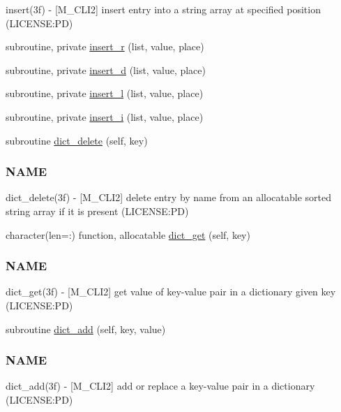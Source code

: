 \begin{DoxyCompactItemize}
\begin{DoxyCompactList}
insert(3f) -\/ \mbox{[}M\+\_\+\+C\+L\+I2\mbox{]} insert entry into a string array at specified position (L\+I\+C\+E\+N\+SE\+:PD) \end{DoxyCompactList}\item 
subroutine, private \mbox{\hyperlink{namespacem__cli2_ae43e655d3678fcc31824a3e9db3daae1}{insert\+\_\+r}} (list, value, place)
\item 
subroutine, private \mbox{\hyperlink{namespacem__cli2_a737ae8e6f73a3fc8cc260732c047fafb}{insert\+\_\+d}} (list, value, place)
\item 
subroutine, private \mbox{\hyperlink{namespacem__cli2_a7e5ee66813d8f6db9d48ebdc350a6b3e}{insert\+\_\+l}} (list, value, place)
\item 
subroutine, private \mbox{\hyperlink{namespacem__cli2_afa6f00a57f1252ba5daa0c440a23ffbb}{insert\+\_\+i}} (list, value, place)
\item 
subroutine \mbox{\hyperlink{namespacem__cli2_afcdd2c59305faf341ebf8ec3b115a05e}{dict\+\_\+delete}} (self, key)
\begin{DoxyCompactList}\small\item\em \subsubsection*{N\+A\+ME}

dict\+\_\+delete(3f) -\/ \mbox{[}M\+\_\+\+C\+L\+I2\mbox{]} delete entry by name from an allocatable sorted string array if it is present (L\+I\+C\+E\+N\+SE\+:PD) \end{DoxyCompactList}\item 
character(len=\+:) function, allocatable \mbox{\hyperlink{namespacem__cli2_a5b489c992f1434fa27e7858a483a38c7}{dict\+\_\+get}} (self, key)
\begin{DoxyCompactList}\small\item\em \subsubsection*{N\+A\+ME}

dict\+\_\+get(3f) -\/ \mbox{[}M\+\_\+\+C\+L\+I2\mbox{]} get value of key-\/value pair in a dictionary given key (L\+I\+C\+E\+N\+SE\+:PD) \end{DoxyCompactList}\item 
subroutine \mbox{\hyperlink{namespacem__cli2_a601a06b7038b524abababc8d437ee823}{dict\+\_\+add}} (self, key, value)
\begin{DoxyCompactList}\small\item\em \subsubsection*{N\+A\+ME}

dict\+\_\+add(3f) -\/ \mbox{[}M\+\_\+\+C\+L\+I2\mbox{]} add or replace a key-\/value pair in a dictionary (L\+I\+C\+E\+N\+SE\+:PD) \end{DoxyCompactList}\end{DoxyCompactItemize}
